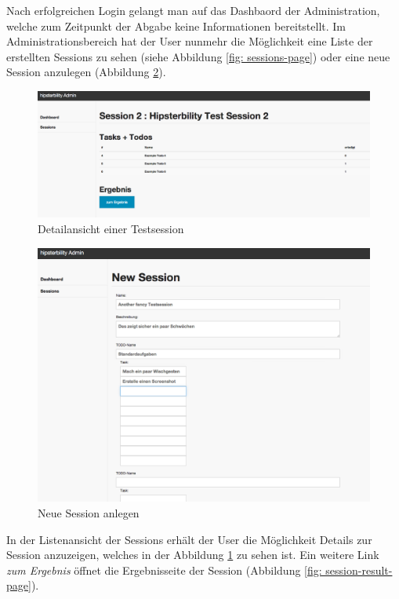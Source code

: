 Nach erfolgreichen Login gelangt man auf das Dashbaord der Administration, welche zum Zeitpunkt der Abgabe keine Informationen bereitstellt. Im Administrationsbereich hat der User nunmehr die Möglichkeit eine Liste der erstellten Sessions zu sehen (siehe Abbildung \ref{fig: sessions-page}) oder eine neue Session anzulegen (Abbildung \ref{fig: session-create-page}). 



\begin{figure}[h!]
	\centering
		\includegraphics[width=\linewidth,keepaspectratio]{img/session-detail-page.png}
	\caption{Detailansicht einer Testsession}
	\label{fig: session-detail-page}
\end{figure}

\begin{figure}[h!]
	\centering
		\includegraphics[width=\linewidth,keepaspectratio]{img/session-create-page.png}
	\caption{Neue Session anlegen}
	\label{fig: session-create-page}
\end{figure}

In der Listenansicht der Sessions erhält der User die Möglichkeit Details zur Session anzuzeigen, welches in der Abbildung \ref{fig: session-detail-page} zu sehen ist. Ein weitere Link \emph{zum Ergebnis} öffnet die Ergebnisseite der Session (Abbildung \ref{fig: session-result-page}).



